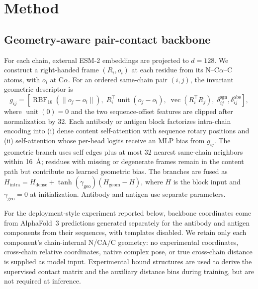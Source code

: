 \documentclass[10pt]{article}
\begin{document}
\section{Method}

\subsection{Geometry-aware pair-contact backbone}

For each chain, external ESM-2 embeddings \citep{lin2023esm} are projected to
$d=128$. We construct a right-handed frame $(R_i,o_i)$ at each residue from its
N--C$\alpha$--C atoms, with $o_i$ at C$\alpha$. For an ordered same-chain pair
$(i,j)$, the invariant geometric descriptor is
\begin{equation}
 g_{ij}=\left[\operatorname{RBF}_{16}(\lVert o_j-o_i\rVert),\;
 R_i^\top\operatorname{unit}(o_j-o_i),\;
 \operatorname{vec}(R_i^\top R_j),\;
 \delta_{ij}^{\mathrm{sgn}},\delta_{ij}^{\mathrm{abs}}\right],
 \label{eq:intra-geometry}
\end{equation}
where $\operatorname{unit}(0)=0$ and the two sequence-offset features are
clipped after normalization by 32.
Each antibody or antigen block factorizes intra-chain encoding into (i) dense
content self-attention with sequence rotary positions and (ii) self-attention
whose per-head logits receive an MLP bias from $g_{ij}$. The geometric branch
uses self edges plus at most 32 nearest same-chain neighbors within
\SI{16}{\angstrom}; residues with missing or degenerate frames remain in the
content path but contribute no learned geometric bias. The branches are fused as
$H_{\mathrm{intra}}=H_{\mathrm{dense}}+
\tanh(\gamma_{\mathrm{geo}})(H_{\mathrm{geom}}-H)$, where $H$ is the block
input and $\gamma_{\mathrm{geo}}=0$ at
initialization. Antibody and antigen use separate parameters.

For the deployment-style experiment reported below, backbone coordinates come
from AlphaFold~3 predictions generated separately for the antibody and antigen
components from their sequences, with templates disabled. We retain only each
component's chain-internal N/CA/C geometry: no experimental coordinates,
cross-chain relative coordinates, native complex pose, or true cross-chain
distance is supplied as model input. Experimental bound structures are used to
derive the supervised contact matrix and the auxiliary distance bins during
training, but are not required at inference.
\end{document}
